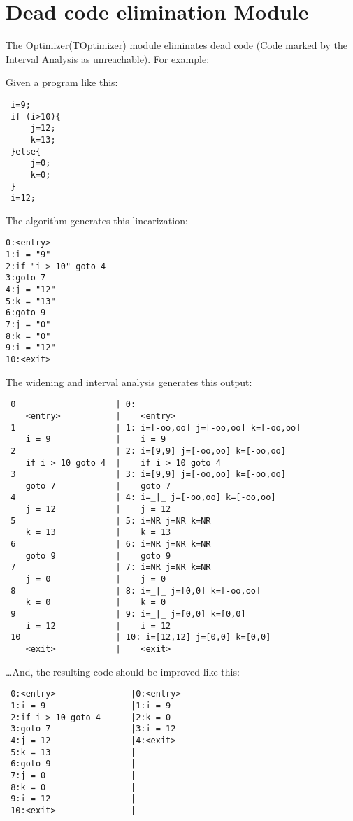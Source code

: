 \documentclass{article}
\begin{document}
\section{Dead code elimination Module}

The Optimizer(TOptimizer) module eliminates dead code (Code marked by the Interval Analysis as unreachable). For example:

Given a program like this:

\begin{verbatim}
 i=9;
 if (i>10){
     j=12;
     k=13;
 }else{
     j=0;
     k=0;
 }
 i=12;
\end{verbatim}
 
The algorithm generates this linearization:

\begin{verbatim}
0:<entry>
1:i = "9"
2:if "i > 10" goto 4
3:goto 7
4:j = "12"
5:k = "13"
6:goto 9
7:j = "0"
8:k = "0"
9:i = "12"
10:<exit>
\end{verbatim}

 The widening and interval analysis generates this output:
 
\begin{verbatim}
 0                    | 0:
    <entry>           |    <entry>
 1                    | 1: i=[-oo,oo] j=[-oo,oo] k=[-oo,oo]
    i = 9             |    i = 9
 2                    | 2: i=[9,9] j=[-oo,oo] k=[-oo,oo]
    if i > 10 goto 4  |    if i > 10 goto 4
 3                    | 3: i=[9,9] j=[-oo,oo] k=[-oo,oo]
    goto 7            |    goto 7
 4                    | 4: i=_|_ j=[-oo,oo] k=[-oo,oo]
    j = 12            |    j = 12
 5                    | 5: i=NR j=NR k=NR
    k = 13            |    k = 13
 6                    | 6: i=NR j=NR k=NR
    goto 9            |    goto 9
 7                    | 7: i=NR j=NR k=NR
    j = 0             |    j = 0
 8                    | 8: i=_|_ j=[0,0] k=[-oo,oo]
    k = 0             |    k = 0
 9                    | 9: i=_|_ j=[0,0] k=[0,0]
    i = 12            |    i = 12
 10                   | 10: i=[12,12] j=[0,0] k=[0,0]
    <exit>            |    <exit>

\end{verbatim}

\dots And, the resulting code should be improved like this: 

\begin{verbatim}
 0:<entry>               |0:<entry>               
 1:i = 9                 |1:i = 9                 
 2:if i > 10 goto 4      |2:k = 0                 
 3:goto 7                |3:i = 12                
 4:j = 12                |4:<exit>                
 5:k = 13                |                        
 6:goto 9                |                        
 7:j = 0                 |                        
 8:k = 0                 |                        
 9:i = 12                |                        
 10:<exit>               |                        

\end{verbatim}
\end{document}
